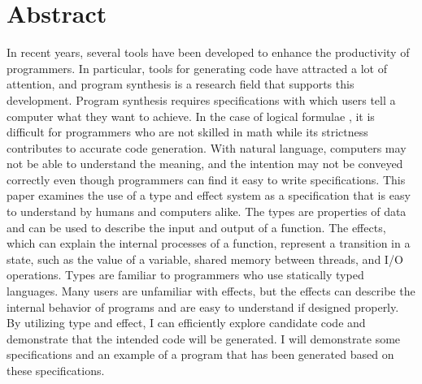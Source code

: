 \documentclass[12pt, a4paper, titlepage]{report}
\begin{document}
\chapter{Abstract} \label{section:abstract}
In recent years, several tools have been developed to enhance the productivity of programmers.
In particular, tools for generating code have attracted a lot of attention, and program synthesis is a research field that supports this development.
Program synthesis requires specifications with which users tell a computer what they want to achieve.
In the case of logical formulae  , it is
difficult for programmers who are not skilled in math while its strictness contributes to accurate code generation.  
With natural language, computers may not be able to understand the meaning, and the intention may not be conveyed correctly even though programmers can find it easy to write specifications.  
This paper examines the use of a type and effect system as a specification that is easy to understand by   humans and computers alike. The types are properties of data and can be used to describe the input and output of a function. The effects, which can explain the internal processes of a function, represent a transition in a state, such as the value of a variable, shared memory between threads, and I/O operations.
 
Types are familiar to programmers who use statically typed languages.
Many users are unfamiliar with effects, but the effects  can describe the internal behavior of programs  and are easy to understand if designed properly.
By utilizing type and effect, I can efficiently explore candidate code and demonstrate that the intended code will be generated. I will demonstrate some specifications and an example of a program that has been generated based on these specifications.
 
\end{document}
